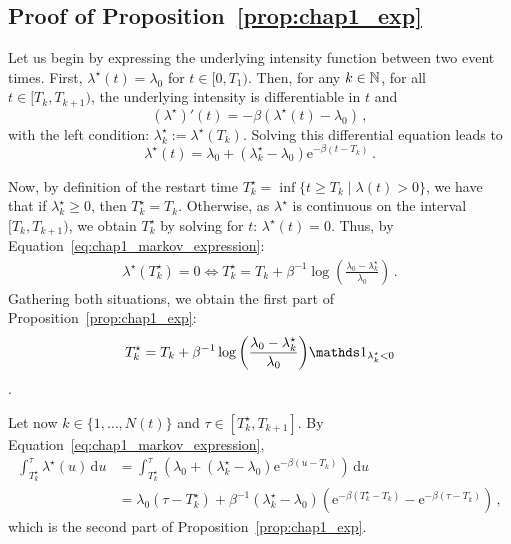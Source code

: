 \begin{subappendices}
\section{Proof of Proposition~\ref{prop:chap1_exp}}
\label{app:chap1_appendix}

Let us begin by expressing the underlying intensity function between two event times.
First, \(\lambda^\star(t) = \lambda_0\) for \(t\in[0,T_1)\).
Then, for any $k\in{\mathbb N}$, for all $t \in [T_k,T_{k+1})$, the underlying intensity is differentiable in \(t\) and
\begin{equation*}
    (\lambda^\star)'(t) = -\beta(\lambda^\star(t) - \lambda_0)\,,
\end{equation*}
with the left condition: $\lambda_k^\star := \lambda^\star(T_k)$.
Solving this differential equation leads to
\begin{equation}\label{eq:chap1_markov_expression}
    \lambda^\star(t) = \lambda_0 + (\lambda_k^\star - \lambda_0)\mathrm{e}^{-\beta(t - T_k)}\,.
\end{equation}

Now, by definition of the restart time $T_k^\star = \inf{\{t\geq T_k\mid \lambda(t) > 0\}}$, we have that if $\lambda_k^\star \geq 0$, then $T_k^\star = T_k$. Otherwise, as $\lambda^\star$ is continuous on the interval $[T_k,T_{k+1})$, we obtain $T_k^\star$ by solving for $t$: \(\lambda^\star(t) = 0\).
Thus, by Equation~\eqref{eq:chap1_markov_expression}:
\begin{align*}
    \lambda^\star(T_k^\star) = 0
    \iff T_k^\star = T_k + \beta^{-1}\log{\left(\frac{\lambda_0 - \lambda^\star_k}{\lambda_0}\right)}\,.
\end{align*}
Gathering both situations, we obtain the first part of Proposition~\ref{prop:chap1_exp}: \[T_k^\star = T_k + \beta^{-1}\log{\left(\frac{\lambda_0 - \lambda^\star_k}{\lambda_0}\right)} \II_{\lambda_k^\star < 0}\].

Let now $k\in\{1,\ldots,N(t)\}$ and $\tau\in[T_{k}^\star,T_{k+1}]$.
By Equation~\eqref{eq:chap1_markov_expression},
\begin{align*}
    \int_{T_{k}^\star}^{\tau}{\lambda^\star(u)\,\mathrm{d}u}
    &= \int_{T_{k}^\star}^{\tau} \left( \lambda_0 + (\lambda_{k}^\star - \lambda_0)\mathrm{e}^{-\beta(u - T_{k})} \right)\,\mathrm{d}u\\
    &= \lambda_0(\tau - T_{k}^\star) + \beta^{-1}(\lambda_{k}^\star - \lambda_0)(\mathrm{e}^{-\beta(T_{k}^\star-T_{k})}-\mathrm{e}^{-\beta(\tau-T_{k})})\,,
\end{align*}
which is the second part of Proposition~\ref{prop:chap1_exp}.


\end{subappendices}
